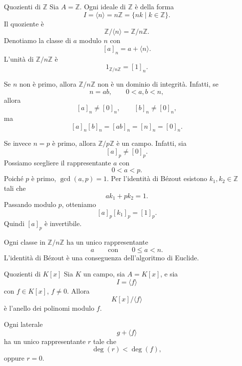 \documentclass[a4paper]{article}
\begin{document}
\begin{radioactive}
\begin{snippetexample}{Quozienti di \(\mathbb{Z}\)}
    Sia \(A=\mathbb{Z}\). Ogni ideale di \(\mathbb{Z}\) è della forma
    \[
        I=\langle n \rangle=n\mathbb{Z}=\{nk\mid k\in\mathbb{Z}\}.
    \]
    Il quoziente è
    \[
        \mathbb{Z}/\langle n \rangle=\mathbb{Z}/n\mathbb{Z}.
    \]
    Denotiamo la classe di \(a\) modulo \(n\) con
    \[
        [a]_n=a+\langle n \rangle.
    \]
    L'unità di \(\mathbb{Z}/n\mathbb{Z}\) è
    \[
        1_{\mathbb{Z}/n\mathbb{Z}}=[1]_n.
    \]

    Se \(n\) non è primo, allora \(\mathbb{Z}/n\mathbb{Z}\) non è un dominio di integrità.
    Infatti, se
    \[
        n=ab,
        \qquad
        0<a,b<n,
    \]
    allora
    \[
        [a]_n\neq [0]_n,
        \qquad
        [b]_n\neq [0]_n,
    \]
    ma
    \[
        [a]_n[b]_n=[ab]_n=[n]_n=[0]_n.
    \]

    Se invece \(n=p\) è primo, allora \(\mathbb{Z}/p\mathbb{Z}\) è un campo.
    Infatti, sia
    \[
        [a]_p\neq [0]_p.
    \]
    Possiamo scegliere il rappresentante \(a\) con
    \[
        0<a<p.
    \]
    Poiché \(p\) è primo, \(\gcd(a,p)=1\). Per l'identità di Bézout esistono \(k_1,k_2\in\mathbb{Z}\) tali che
    \[
        ak_1+pk_2=1.
    \]
    Passando modulo \(p\), otteniamo
    \[
        [a]_p[k_1]_p=[1]_p.
    \]
    Quindi \([a]_p\) è invertibile.
\end{snippetexample}
\end{radioactive}

\begin{radioactive}
Ogni classe in \(\mathbb{Z}/n\mathbb{Z}\) ha un unico rappresentante
\[
    a
    \qquad
    \text{con}
    \qquad
    0\leq a<n.
\]
L'identità di Bézout è una conseguenza dell'algoritmo di Euclide.
\end{radioactive}

\begin{radioactive}
\begin{snippetexample}{Quozienti di \(K[x]\)}
    Sia \(K\) un campo, sia \(A=K[x]\), e sia
    \[
        I=\langle f \rangle
    \]
    con \(f\in K[x]\), \(f\neq 0\).
    Allora
    \[
        K[x]/\langle f \rangle
    \]
    è l'anello dei polinomi modulo \(f\).

    Ogni laterale
    \[
        g+\langle f \rangle
    \]
    ha un unico rappresentante \(r\) tale che
    \[
        \deg(r)<\deg(f),
    \]
    oppure \(r=0\).
\end{snippetexample}
\end{radioactive}
\end{document}

